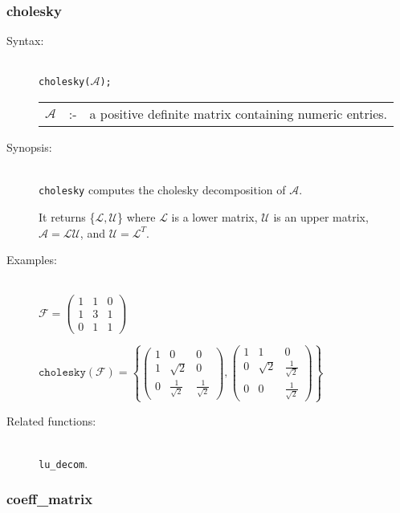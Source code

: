 \subsubsection{cholesky}
\label{linalg:cholesky}

\begin{description}
\item[Syntax:]\mbox{}\\
\texttt{cholesky($\mathcal{A}$);}\\[2mm]
\begin{tabular}{l l l}
$\mathcal{A}$ &:-& a positive definite matrix containing numeric entries.
\end{tabular}

\item[Synopsis:]\mbox{}\\
\texttt{cholesky} computes the cholesky decomposition of $\mathcal{A}$.

It returns \{$\mathcal{L},\mathcal{U}$\} where $\mathcal{L}$
is a lower matrix, $\mathcal{U}$ is an upper matrix, \\ $\mathcal{A} =
\mathcal{LU}$, and $\mathcal{U} = \mathcal{L}^T$.

\item[Examples:]\mbox{}\\
  \(\mathcal{F} = \begin{pmatrix} 1 & 1 & 0 \\ 1 & 3 & 1 \\ 0 & 1 & 1 \end{pmatrix}\)

  \(\texttt{cholesky}(\mathcal{F})  =
  \left\{ \begin{pmatrix} 1 & 0 & 0 \\ 1 & \sqrt{2} & 0 \\
    0 & \frac{1}{\sqrt{2}} & \frac{1}{\sqrt{2}} \end{pmatrix},
  \begin{pmatrix} 1 & 1 & 0 \\ 0 & \sqrt{2} & \frac{1}{\sqrt{2}} \\ 0
    & 0 & \frac{1}{\sqrt{2}} \end{pmatrix}
  \right\}\)

\item[Related functions:]\mbox{}\\
\texttt{lu\_decom}.
\end{description}


\subsubsection{coeff\_matrix}
\label{linalg:coeff_matrix}

